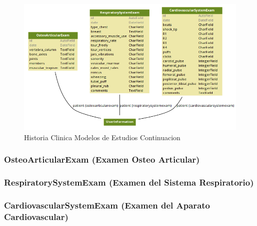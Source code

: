 \begin{figure}[H]
    \centering
    \includegraphics[scale=0.5]{resourse/hc4.png}
    \caption{Historia Clinica Modelos de Estudios Continuacion}
    \label{fig:hc3}
\end{figure} 


\subsubsection{OsteoArticularExam (Examen Osteo Articular)}

\subsubsection{RespiratorySystemExam (Examen del Sistema Respiratorio)}

\subsubsection{CardiovascularSystemExam (Examen del Aparato Cardiovascular)}



